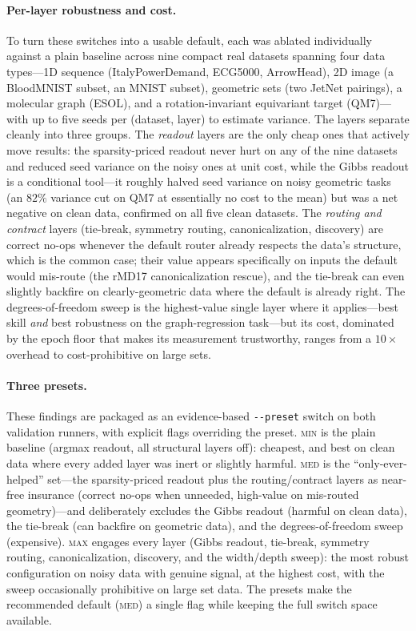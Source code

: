 \documentclass[11pt]{article}
\newcommand{\allowbreakhere}{\discretionary{}{}{}}
\newcommand{\code}[1]{\texttt{\def\_{\char`_\allowbreakhere}#1}}
\begin{document}
\paragraph{Per-layer robustness and cost.} To turn these switches into a usable default, each was
ablated individually against a plain baseline across nine compact real datasets spanning four data
types---1D sequence (ItalyPowerDemand, ECG5000, ArrowHead), 2D image (a BloodMNIST subset, an MNIST
subset), geometric sets (two JetNet pairings), a molecular graph (ESOL), and a rotation-invariant
equivariant target (QM7)---with up to five seeds per (dataset, layer) to estimate variance. The layers
separate cleanly into three groups. The \emph{readout} layers are the only cheap ones that actively move
results: the sparsity-priced readout never hurt on any of the nine datasets and reduced seed variance on
the noisy ones at unit cost, while the Gibbs readout is a conditional tool---it roughly halved seed
variance on noisy geometric tasks (an $82\%$ variance cut on QM7 at essentially no cost to the mean) but
was a net negative on clean data, confirmed on all five clean datasets. The \emph{routing and contract}
layers (tie-break, symmetry routing, canonicalization, discovery) are correct no-ops whenever the
default router already respects the data's structure, which is the common case; their value appears
specifically on inputs the default would mis-route (the rMD17 canonicalization rescue), and the
tie-break can even slightly backfire on clearly-geometric data where the default is already right. The
degrees-of-freedom sweep is the highest-value single layer where it applies---best skill \emph{and} best
robustness on the graph-regression task---but its cost, dominated by the epoch floor that makes its
measurement trustworthy, ranges from a $10\times$ overhead to cost-prohibitive on large sets.

\paragraph{Three presets.} These findings are packaged as an evidence-based \code{-{}-preset} switch on
both validation runners, with explicit flags overriding the preset. \textsc{min} is the plain baseline
(argmax readout, all structural layers off): cheapest, and best on clean data where every added layer
was inert or slightly harmful. \textsc{med} is the ``only-ever-helped'' set---the sparsity-priced
readout plus the routing/contract layers as near-free insurance (correct no-ops when unneeded,
high-value on mis-routed geometry)---and deliberately excludes the Gibbs readout (harmful on clean data),
the tie-break (can backfire on geometric data), and the degrees-of-freedom sweep (expensive). \textsc{max}
engages every layer (Gibbs readout, tie-break, symmetry routing, canonicalization, discovery, and the
width/depth sweep): the most robust configuration on noisy data with genuine signal, at the highest cost,
with the sweep occasionally prohibitive on large set data. The presets make the recommended default
(\textsc{med}) a single flag while keeping the full switch space available.
\end{document}
